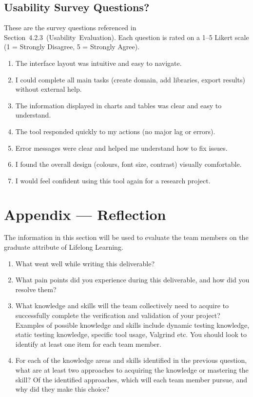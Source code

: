 \documentclass[12pt, titlepage]{article}
\begin{document}
\subsection{Usability Survey Questions?}
\label{sec:usability-survey}
These are the survey questions referenced in
Section~4.2.3~(Usability~Evaluation). Each question is rated on a 1–5
Likert scale (1 = Strongly Disagree, 5 = Strongly Agree).

\begin{enumerate}
  \item The interface layout was intuitive and easy to navigate.
  \item I could complete all main tasks (create domain, add libraries, export results) without external help.
  \item The information displayed in charts and tables was clear and easy to understand.
  \item The tool responded quickly to my actions (no major lag or errors).
  \item Error messages were clear and helped me understand how to fix issues.
  \item I found the overall design (colours, font size, contrast) visually comfortable.
  \item I would feel confident using this tool again for a research project.
\end{enumerate}

\newpage{}
\section*{Appendix --- Reflection}


The information in this section will be used to evaluate the team members on the
graduate attribute of Lifelong Learning.



\begin{enumerate}
  \item What went well while writing this deliverable? 
  \item What pain points did you experience during this deliverable, and how
    did you resolve them?
  \item What knowledge and skills will the team collectively need to acquire to
  successfully complete the verification and validation of your project?
  Examples of possible knowledge and skills include dynamic testing knowledge,
  static testing knowledge, specific tool usage, Valgrind etc.  You should look to
  identify at least one item for each team member.
  \item For each of the knowledge areas and skills identified in the previous
  question, what are at least two approaches to acquiring the knowledge or
  mastering the skill?  Of the identified approaches, which will each team
  member pursue, and why did they make this choice?
\end{enumerate}
\end{document}
